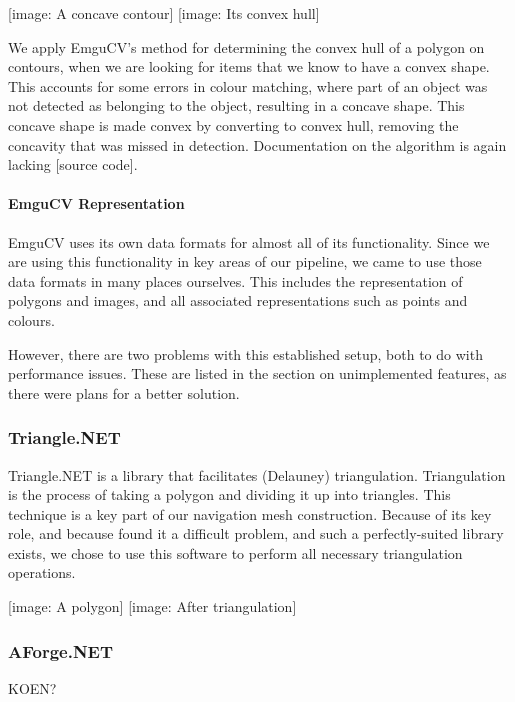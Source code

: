 \documentclass[10pt,twocolumn]{article}
\begin{document}
[image: A concave contour] [image: Its convex hull]

We apply EmguCV's method for determining the convex hull of a polygon on contours, when we are looking for items that we know to have a convex shape. This accounts for some errors in colour matching, where part of an object was not detected as belonging to the object, resulting in a concave shape. This concave shape is made convex by converting to convex hull, removing the concavity that was missed in detection. Documentation on the algorithm is again lacking [source code].

\paragraph{EmguCV Representation}
EmguCV uses its own data formats for almost all of its functionality. Since we are using this functionality in key areas of our pipeline, we came to use those data formats in many places ourselves. This includes the representation of polygons and images, and all associated representations such as points and colours.

However, there are two problems with this established setup, both to do with performance issues. These are listed in the section on unimplemented features, as there were plans for a better solution.

\subsubsection{Triangle.NET}
Triangle.NET is a library that facilitates (Delauney) triangulation. Triangulation is the process of taking a polygon and dividing it up into triangles. This technique is a key part of our navigation mesh construction. Because of its key role, and because found it a difficult problem, and such a perfectly-suited library exists, we chose to use this software to perform all necessary triangulation operations.

[image: A polygon] [image: After triangulation]

\subsubsection{AForge.NET}
KOEN?
\end{document}
